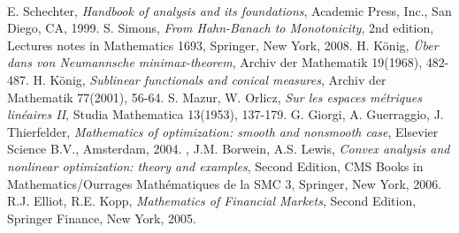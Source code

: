 \documentclass[a4paper,11pt]{book}
\begin{document}
	
\tableofcontents
%

%
%
%
%
%
%
%
%
%
%





\\
















\nocite{*}
% 
% 
\begin{thebibliography}{X}
	 E. Schechter,
	\textsl{Handbook of analysis and its foundations}, Academic Press, Inc., San Diego, CA, 1999.
	 S. Simons, \textsl{From Hahn-Banach to Monotonicity}, 2nd edition, Lectures notes in Mathematics 1693, Springer, New York, 2008.
	 H. König, \textsl{Über dans von Neumannsche minimax-theorem}, Archiv der Mathematik 19(1968), 482-487.
	 H. König, \textsl{Sublinear functionals and conical measures}, Archiv der Mathematik 77(2001), 56-64.
	 S. Mazur, W. Orlicz, \textsl{Sur les espaces métriques linéaires II}, Studia Mathematica 13(1953), 137-179.
	 G. Giorgi, A. Guerraggio, J. Thierfelder, \textsl{Mathematics of optimization: smooth and nonsmooth case}, Elsevier Science B.V., Amsterdam, 2004.
	, J.M. Borwein, A.S. Lewis, \textsl{Convex analysis and nonlinear optimization: theory and examples}, Second Edition, CMS Books in Mathematics/Ourrages Mathématiques de la SMC 3, Springer, New York, 2006.
	 R.J. Elliot, R.E. Kopp, \textsl{Mathematics of Financial Markets}, Second Edition, Springer Finance, New York, 2005.
	
\end{thebibliography}
\end{document}
